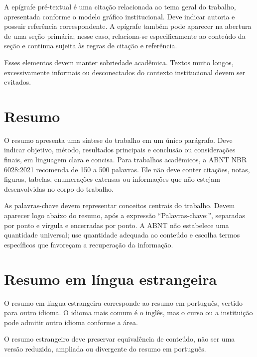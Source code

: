 A epígrafe pré-textual é uma citação relacionada ao tema geral do trabalho, apresentada conforme o modelo gráfico institucional. Deve indicar autoria e possuir referência correspondente. A epígrafe também pode aparecer na abertura de uma seção primária; nesse caso, relaciona-se especificamente ao conteúdo da seção e continua sujeita às regras de citação e referência.

Esses elementos devem manter sobriedade acadêmica. Textos muito longos, excessivamente informais ou desconectados do contexto institucional devem ser evitados.

\section{Resumo}

O resumo apresenta uma síntese do trabalho em um único parágrafo. Deve indicar objetivo, método, resultados principais e conclusão ou considerações finais, em linguagem clara e concisa. Para trabalhos acadêmicos, a ABNT NBR 6028:2021 recomenda de 150 a 500 palavras. Ele não deve conter citações, notas, figuras, tabelas, enumerações extensas ou informações que não estejam desenvolvidas no corpo do trabalho.

As palavras-chave devem representar conceitos centrais do trabalho. Devem aparecer logo abaixo do resumo, após a expressão ``Palavras-chave:'', separadas por ponto e vírgula e encerradas por ponto. A ABNT não estabelece uma quantidade universal; use quantidade adequada ao conteúdo e escolha termos específicos que favoreçam a recuperação da informação.

\decisaoinstitucional

\section{Resumo em língua estrangeira}

O resumo em língua estrangeira corresponde ao resumo em português, vertido para outro idioma. O idioma mais comum é o inglês, mas o curso ou a instituição pode admitir outro idioma conforme a área.

O resumo estrangeiro deve preservar equivalência de conteúdo, não ser uma versão reduzida, ampliada ou divergente do resumo em português.


